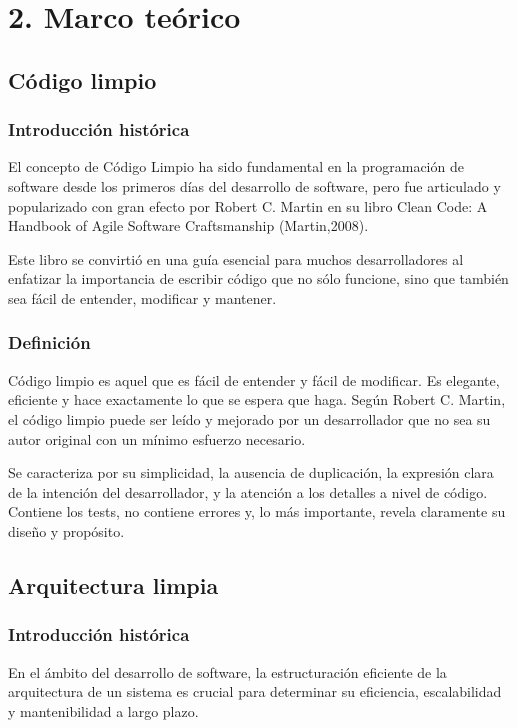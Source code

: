 \chapter*{2. Marco teórico}\label{ch:chapter_2}
\section*{Código limpio}
\subsection*{Introducción histórica}
El concepto de Código Limpio ha sido fundamental en la programación de software desde los primeros días del desarrollo
de software, pero fue articulado y popularizado con gran efecto por Robert C. Martin en su libro Clean Code: A Handbook
of Agile Software Craftsmanship (Martin,2008).

Este libro se convirtió en una guía esencial para muchos desarrolladores al enfatizar la importancia de escribir código
que no sólo funcione, sino que también sea fácil de entender, modificar y mantener.

\subsection*{Definición}
Código limpio es aquel que es fácil de entender y fácil de modificar.
Es elegante, eficiente y hace exactamente lo que se espera que haga.
Según Robert C. Martin, el código limpio puede ser leído y mejorado por un
desarrollador que no sea su autor original con un mínimo esfuerzo necesario.

Se caracteriza por su simplicidad, la ausencia de duplicación, la expresión clara de la intención del desarrollador, y
la atención a los detalles a nivel de código.
Contiene los tests, no contiene errores y, lo más importante, revela claramente su diseño y propósito.

\section*{Arquitectura limpia}
\subsection*{Introducción histórica}
En el ámbito del desarrollo de software, la estructuración eficiente de la arquitectura de un sistema
es crucial para determinar su eficiencia, escalabilidad y mantenibilidad a largo plazo.

